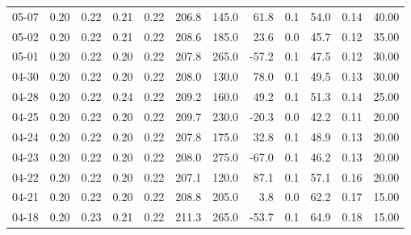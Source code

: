 \begin{threeparttable}
{\begin{tabular}{lrrrrrrrrrrr}
  05-07 &          0.20 &          0.22 &          0.21 &        0.22 &               206.8 &               145.0 &       61.8 &                 0.1 &             54.0 &            0.14 &                  40.00 \\
  05-02 &          0.20 &          0.22 &          0.21 &        0.22 &               208.6 &               185.0 &       23.6 &                 0.0 &             45.7 &            0.12 &                  35.00 \\
  05-01 &          0.20 &          0.22 &          0.20 &        0.22 &               207.8 &               265.0 &      -57.2 &                 0.1 &             47.5 &            0.12 &                  30.00 \\
  04-30 &          0.20 &          0.22 &          0.20 &        0.22 &               208.0 &               130.0 &       78.0 &                 0.1 &             49.5 &            0.13 &                  30.00 \\
  04-28 &          0.20 &          0.22 &          0.24 &        0.22 &               209.2 &               160.0 &       49.2 &                 0.1 &             51.3 &            0.14 &                  25.00 \\
  04-25 &          0.20 &          0.22 &          0.20 &        0.22 &               209.7 &               230.0 &      -20.3 &                 0.0 &             42.2 &            0.11 &                  20.00 \\
  04-24 &          0.20 &          0.22 &          0.20 &        0.22 &               207.8 &               175.0 &       32.8 &                 0.1 &             48.9 &            0.13 &                  20.00 \\
  04-23 &          0.20 &          0.22 &          0.20 &        0.22 &               208.0 &               275.0 &      -67.0 &                 0.1 &             46.2 &            0.13 &                  20.00 \\
  04-22 &          0.20 &          0.22 &          0.20 &        0.22 &               207.1 &               120.0 &       87.1 &                 0.1 &             57.1 &            0.16 &                  20.00 \\
  04-21 &          0.20 &          0.22 &          0.20 &        0.22 &               208.8 &               205.0 &        3.8 &                 0.0 &             62.2 &            0.17 &                  15.00 \\
  04-18 &          0.20 &          0.23 &          0.21 &        0.22 &               211.3 &               265.0 &      -53.7 &                 0.1 &             64.9 &            0.18 &                  15.00 \\

\end{tabular}}
\end{threeparttable}
